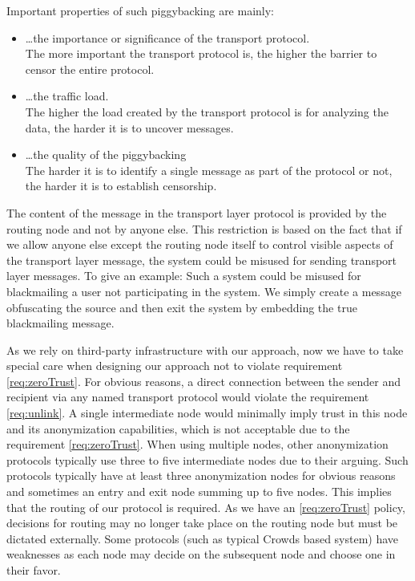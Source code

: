 Important properties of such piggybacking are mainly:
\begin{itemize}
	\item \ldots the importance or significance of the transport protocol.\\
	The more important the transport protocol is, the higher the barrier to censor the entire protocol.
	\item \ldots the traffic load.\\
	The higher the load created by the transport protocol is for analyzing the data, the harder it is to uncover messages.
	\item \ldots the quality of the piggybacking\\
	The harder it is to identify a single message as part of the protocol or not, the harder it is to establish censorship.
\end{itemize} 

The content of the message in the transport layer protocol is provided by the routing node and not by anyone else. This restriction is based on the fact that if we allow anyone else except the routing node itself to control visible aspects of the transport layer message, the system could be misused for sending transport layer messages. To give an example: Such a system could be misused for blackmailing a user not participating in the system. We simply create a message obfuscating the source and then exit the system by embedding the true blackmailing message. 

As we rely on third-party infrastructure with our approach, now we have to take special care when designing our approach not to violate requirement \ref{req:zeroTrust}. For obvious reasons, a direct connection between the sender and recipient via any named transport protocol would violate the requirement \ref{req:unlink}. A single intermediate node would minimally imply trust in this node and its anonymization capabilities, which is not acceptable due to the requirement \ref{req:zeroTrust}. When using multiple nodes, other anonymization protocols typically use three to five intermediate nodes due to their arguing. Such protocols typically have at least three anonymization nodes for obvious reasons and sometimes an entry and exit node summing up to five nodes. This implies that the routing of our protocol is required. As we have an \ref{req:zeroTrust} policy, decisions for routing may no longer take place on the routing node but must be dictated externally. Some protocols (such as typical Crowds based system) have weaknesses as each node may decide on the subsequent node and choose one in their favor.

